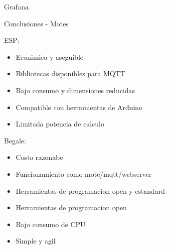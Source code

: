 \documentclass[aspectratio= 43]{beamer}
\begin{document}
\begin{frame}{Grafana}
\end{frame}


\begin{frame}{Conclusiones - Motes}
      \begin{multicols}{2}
			ESP:
			\begin{itemize}
            \item Econimico y aseguible
            \item Bibliotecas disponibles para MQTT
            \item Bajo consumo y dimensiones reducidas
            \item Compatible con herramientas de Arduino
            \item Limitada potencia de calculo
			\end{itemize}

			\columnbreak

			Begale:
			\begin{itemize}
            \item Costo razonabe 
            \item Funcionamiento como mote/mqtt/webserver
            \item Herramientas de programacion open y estandard
            \item Herramientas de programacion open
            \item Bajo consumo de CPU
            \item Simple y agil
			\end{itemize}
      \end{multicols} 
  \end{frame}
\end{document}
